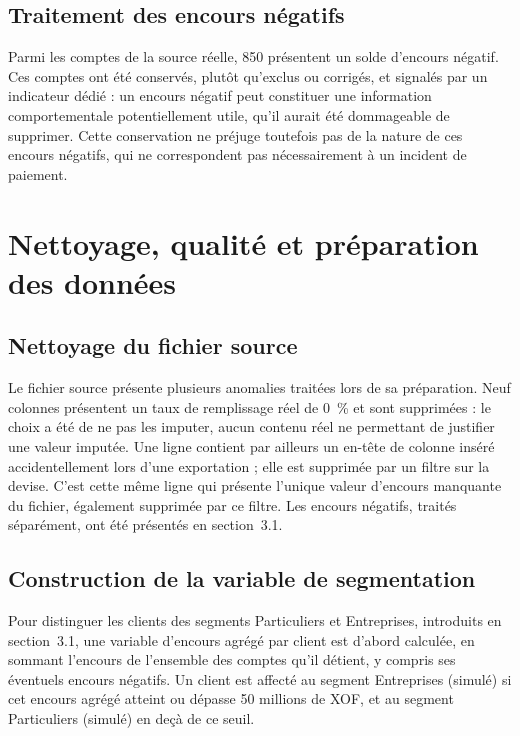 \subsection{Traitement des encours négatifs}

Parmi les comptes de la source réelle, 850 présentent un solde d'encours négatif. Ces comptes ont été conservés, plutôt qu'exclus ou corrigés, et signalés par un indicateur dédié : un encours négatif peut constituer une information comportementale potentiellement utile, qu'il aurait été dommageable de supprimer. Cette conservation ne préjuge toutefois pas de la nature de ces encours négatifs, qui ne correspondent pas nécessairement à un incident de paiement.

\section{Nettoyage, qualité et préparation des données}

\subsection{Nettoyage du fichier source}

Le fichier source présente plusieurs anomalies traitées lors de sa préparation. Neuf colonnes présentent un taux de remplissage réel de 0~\% et sont supprimées : le choix a été de ne pas les imputer, aucun contenu réel ne permettant de justifier une valeur imputée. Une ligne contient par ailleurs un en-tête de colonne inséré accidentellement lors d'une exportation ; elle est supprimée par un filtre sur la devise. C'est cette même ligne qui présente l'unique valeur d'encours manquante du fichier, également supprimée par ce filtre. Les encours négatifs, traités séparément, ont été présentés en section~3.1.

\subsection{Construction de la variable de segmentation}

Pour distinguer les clients des segments Particuliers et Entreprises, introduits en section~3.1, une variable d'encours agrégé par client est d'abord calculée, en sommant l'encours de l'ensemble des comptes qu'il détient, y compris ses éventuels encours négatifs. Un client est affecté au segment Entreprises (simulé) si cet encours agrégé atteint ou dépasse 50 millions de XOF, et au segment Particuliers (simulé) en deçà de ce seuil.

